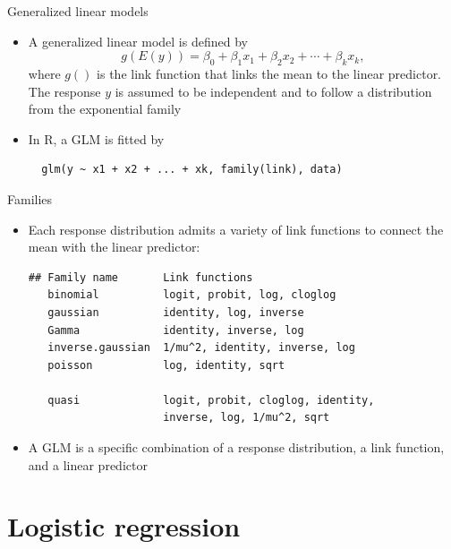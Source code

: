 \documentclass[aspectratio=169]{beamer}
\begin{document}
\begin{frame}[fragile]{Generalized linear models}
  \begin{itemize}
    \item A generalized linear model is defined by
\[
  g(E(y)) = \beta_0 + \beta_1 x_1 + \beta_2 x_2 + \cdots + \beta_k x_k,
\]
where $g()$ is the link function that links the mean to the linear predictor.
The response $y$ is assumed to be independent and to follow a distribution
from the exponential family

\item In R, a GLM is fitted by

  \begin{lstlisting}
  glm(y ~ x1 + x2 + ... + xk, family(link), data)
\end{lstlisting}
  \end{itemize}
\end{frame}

\begin{frame}[fragile]{Families}
  \begin{itemize}
    \item Each response distribution admits a variety of link functions to
      connect the mean with the linear predictor:

  \begin{lstlisting}
## Family name       Link functions
   binomial          logit, probit, log, cloglog
   gaussian          identity, log, inverse
   Gamma             identity, inverse, log
   inverse.gaussian  1/mu^2, identity, inverse, log
   poisson           log, identity, sqrt

   quasi             logit, probit, cloglog, identity,
                     inverse, log, 1/mu^2, sqrt
\end{lstlisting}
\item A GLM is a specific combination of a response distribution, a link
  function, and a linear predictor
  \end{itemize}
\end{frame}

\section{Logistic regression}
\end{document}
